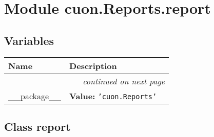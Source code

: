 %
%
%


\section{Module cuon.Reports.report}

    \label{cuon:Reports:report}


  \subsection{Variables}

    \vspace{-1cm}
\hspace{\varindent}\begin{longtable}{|p{\varnamewidth}|p{\vardescrwidth}|l}
\cline{1-2}
\cline{1-2} \centering \textbf{Name} & \centering \textbf{Description}& \\
\cline{1-2}
\endhead\cline{1-2}\multicolumn{3}{r}{\small\textit{continued on next page}}\\\endfoot\cline{1-2}
\endlastfoot\raggedright \_\-\_\-p\-a\-c\-k\-a\-g\-e\-\_\-\_\- & \raggedright \textbf{Value:} 
{\tt \texttt{'}\texttt{cuon.Reports}\texttt{'}}&\\
\cline{1-2}
\end{longtable}



\subsection{Class report}

